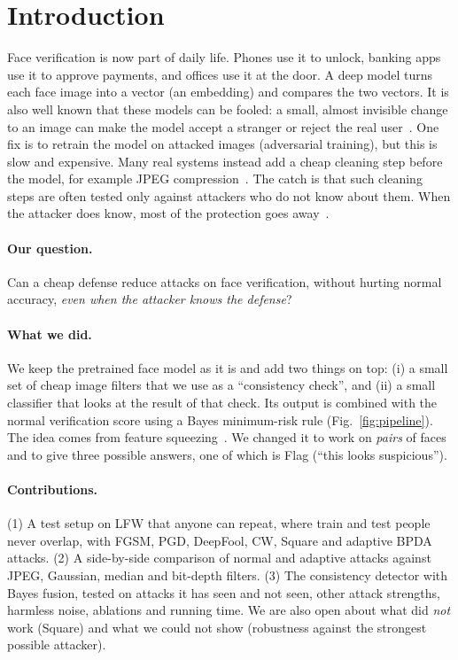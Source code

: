 \section{Introduction}
\label{sec:intro}
Face verification is now part of daily life. Phones use it to unlock, banking apps use it to approve payments, and offices use it at the door. A deep model turns each face image into a vector (an embedding) and compares the two vectors. It is also well known that these models can be fooled: a small, almost invisible change to an image can make the model accept a stranger or reject the real user~\cite{goswami2018unravelling}. One fix is to retrain the model on attacked images (adversarial training), but this is slow and expensive. Many real systems instead add a cheap cleaning step before the model, for example JPEG compression~\cite{dziugaite2016jpeg,das2018shield}. The catch is that such cleaning steps are often tested only against attackers who do not know about them. When the attacker does know, most of the protection goes away~\cite{athalye2018obfuscated}.

\paragraph{Our question.} Can a cheap defense reduce attacks on face verification, without hurting normal accuracy, \emph{even when the attacker knows the defense}?

\paragraph{What we did.} We keep the pretrained face model as it is and add two things on top: (i) a small set of cheap image filters that we use as a ``consistency check'', and (ii) a small classifier that looks at the result of that check. Its output is combined with the normal verification score using a Bayes minimum-risk rule (Fig.~\ref{fig:pipeline}). The idea comes from feature squeezing~\cite{xu2018squeeze}. We changed it to work on \emph{pairs} of faces and to give three possible answers, one of which is Flag (``this looks suspicious'').

\paragraph{Contributions.} (1) A test setup on LFW that anyone can repeat, where train and test people never overlap, with FGSM, PGD, DeepFool, CW, Square and adaptive BPDA attacks. (2) A side-by-side comparison of normal and adaptive attacks against JPEG, Gaussian, median and bit-depth filters. (3) The consistency detector with Bayes fusion, tested on attacks it has seen and not seen, other attack strengths, harmless noise, ablations and running time. We are also open about what did \emph{not} work (Square) and what we could not show (robustness against the strongest possible attacker).

